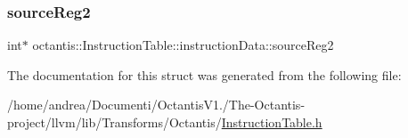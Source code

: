 \subsubsection{\texorpdfstring{source\+Reg2}{sourceReg2}}
{\footnotesize\ttfamily int$\ast$ octantis\+::\+Instruction\+Table\+::instruction\+Data\+::source\+Reg2}



The documentation for this struct was generated from the following file\+:\begin{DoxyCompactItemize}
\item 
/home/andrea/\+Documenti/\+Octantis\+V1./\+The-\/\+Octantis-\/project/llvm/lib/\+Transforms/\+Octantis/\hyperlink{InstructionTable_8h}{Instruction\+Table.\+h}\end{DoxyCompactItemize}
